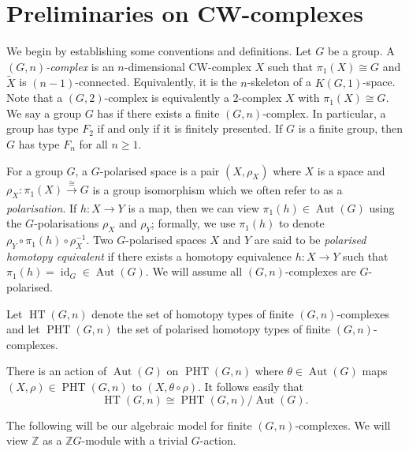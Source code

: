 \documentclass[11pt,a4paper,leqno]{amsart}
\theoremstyle{definition}
\theoremstyle{remark}
\newcommand{\wt}{\widetilde}
\newcommand{\Z}{\mathbb{Z}}
\DeclareMathOperator{\Aut}{Aut}
\DeclareMathOperator{\id}{id}
\DeclareMathOperator{\HT}{HT}
\DeclareMathOperator{\PHT}{PHT}
\begin{document}
\setcounter{tocdepth}{1}
\tableofcontents

\vspace{-7mm}

\section{Preliminaries on CW-complexes}
\label{s:preliminaries}

We begin by establishing some conventions and definitions.
Let $G$ be a group. A \textit{$(G,n)$-complex} is an $n$-dimensional CW-complex $X$ such that $\pi_1(X) \cong G$ and $\wt X$ is $(n-1)$-connected. Equivalently, it is the $n$-skeleton of a $K(G,1)$-space.
Note that a $(G,2)$-complex is equivalently a $2$-complex $X$ with $\pi_1(X) \cong G$.
We say a group $G$ has  if there exists a finite $(G,n)$-complex. In particular, a group has type $F_2$ if and only if it is finitely presented. If $G$ is a finite group, then $G$ has type $F_n$ for all $n \ge 1$.

For a group $G$, a $G$-polarised space is a pair $(X,\rho_X)$ where $X$ is a space and $\rho_X\colon \pi_1(X) \xrightarrow[]{\cong} G$ is a group isomorphism which we often refer to as a \textit{polarisation}. 
If $h\colon  X \to Y$ is a map, then we can view $\pi_1(h) \in \Aut(G)$ using the $G$-polarisations $\rho_X$ and $\rho_Y$; formally, we use $\pi_1(h)$ to denote $\rho_Y \circ \pi_1(h) \circ \rho_X^{-1}$.
Two $G$-polarised spaces $X$ and $Y$ are said to be \textit{polarised homotopy equivalent} if there exists a homotopy equivalence $h\colon X \to Y$ such that $\pi_1(h) = \id_G \in \Aut(G)$.
We will assume all $(G,n)$-complexes are $G$-polarised.

Let $\HT(G,n)$ denote the set of homotopy types of finite $(G,n)$-complexes and let $\PHT(G,n)$ the set of polarised homotopy types of finite $(G,n)$-complexes. 

There is an action of $\Aut(G)$ on $\PHT(G,n)$ where $\theta \in \Aut(G)$ maps $(X,\rho) \in \PHT(G,n)$ to $(X,\theta \circ \rho)$. It follows easily that
\[ \HT(G,n) \cong \PHT(G,n) / \Aut(G). \]

The following will be our algebraic model for finite $(G,n)$-complexes. We will view $\Z$ as a $\Z G$-module with a trivial $G$-action. 
\end{document}
